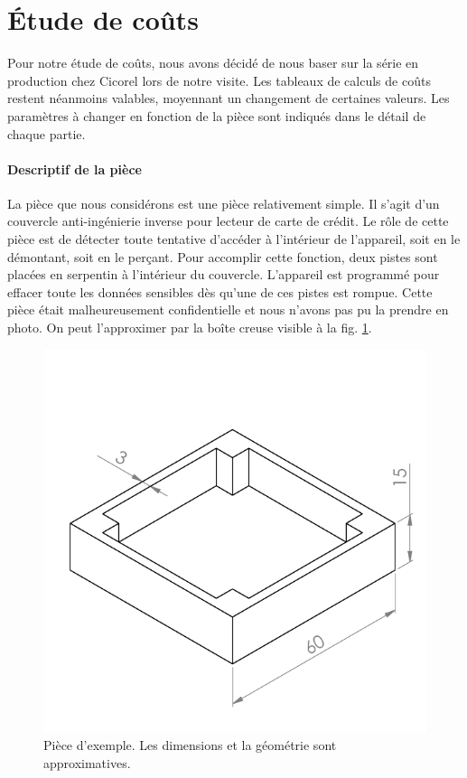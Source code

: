 \section{Étude de coûts}
Pour notre étude de coûts, nous avons décidé de nous baser sur la série en production chez Cicorel lors de notre visite.
Les tableaux de calculs de coûts restent néanmoins valables, moyennant un changement de certaines valeurs.
Les paramètres à changer en fonction de la pièce sont indiqués dans le détail de chaque partie.


\paragraph{Descriptif de la pièce}
La pièce que nous considérons est une pièce relativement simple.
Il s'agit d'un couvercle anti-ingénierie inverse pour lecteur de carte de crédit.
Le rôle de cette pièce est de détecter toute tentative d'accéder à l'intérieur de l'appareil, soit en le démontant, soit en le perçant.
Pour accomplir cette fonction, deux pistes sont placées en serpentin à l'intérieur du couvercle.
L'appareil est programmé pour effacer toute les données sensibles dès qu'une de ces pistes est rompue.
Cette pièce était malheureusement confidentielle et nous n'avons pas pu la prendre en photo.
On peut l'approximer par la boîte creuse visible à la fig. \ref{fig:example-part}.

\begin{figure}[h]
    \begin{center}
        \includegraphics[width=\textwidth]{images/example_part/example_mid}
        \caption{Pièce d'exemple. Les dimensions et la géométrie sont approximatives.}\label{fig:example-part}
    \end{center}
\end{figure}
